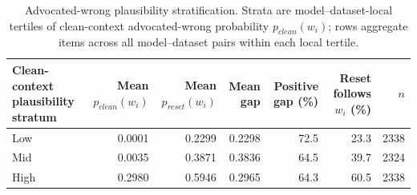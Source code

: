 \begin{table}[t]
\centering
\small
\begin{tabular}{lrrrrrr}
\hline
Clean-context plausibility stratum & Mean $p_{clean}(w_i)$ & Mean $p_{reset}(w_i)$ & Mean gap & Positive gap (\%) & Reset follows $w_i$ (\%) & $n$ \\
\hline
Low & 0.0001 & 0.2299 & 0.2298 & 72.5 & 23.3 & 2338 \\
Mid & 0.0035 & 0.3871 & 0.3836 & 64.5 & 39.7 & 2324 \\
High & 0.2980 & 0.5946 & 0.2965 & 64.3 & 60.5 & 2338 \\
\hline
\end{tabular}
\caption{Advocated-wrong plausibility stratification. Strata are model--dataset-local tertiles of clean-context advocated-wrong probability $p_{clean}(w_i)$; rows aggregate items across all model--dataset pairs within each local tertile.}
\label{tab:wrong-answer-plausibility}
\end{table}
